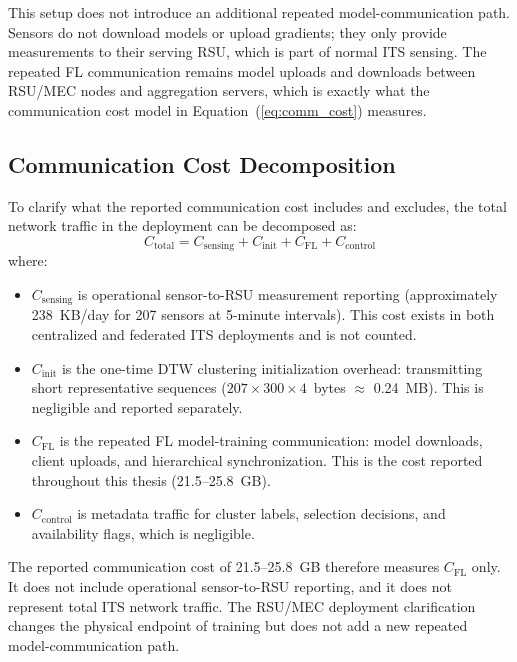 This setup does not introduce an additional repeated model-communication path. Sensors do not download models or upload gradients; they only provide measurements to their serving RSU, which is part of normal ITS sensing. The repeated FL communication remains model uploads and downloads between RSU/MEC nodes and aggregation servers, which is exactly what the communication cost model in Equation~(\ref{eq:comm_cost}) measures.

\subsection{Communication Cost Decomposition}
\label{sec:comm_decomp}

To clarify what the reported communication cost includes and excludes, the total network traffic in the deployment can be decomposed as:
\begin{equation}
\label{eq:comm_decomp}
C_{\text{total}} = C_{\text{sensing}} + C_{\text{init}} + C_{\text{FL}} + C_{\text{control}}
\end{equation}
where:
\begin{itemize}
    \item $C_{\text{sensing}}$ is operational sensor-to-RSU measurement reporting (approximately 238~KB/day for 207 sensors at 5-minute intervals). This cost exists in both centralized and federated ITS deployments and is not counted.
    \item $C_{\text{init}}$ is the one-time DTW clustering initialization overhead: transmitting short representative sequences ($207 \times 300 \times 4$~bytes $\approx$ 0.24~MB). This is negligible and reported separately.
    \item $C_{\text{FL}}$ is the repeated FL model-training communication: model downloads, client uploads, and hierarchical synchronization. This is the cost reported throughout this thesis (21.5--25.8~GB).
    \item $C_{\text{control}}$ is metadata traffic for cluster labels, selection decisions, and availability flags, which is negligible.
\end{itemize}

The reported communication cost of 21.5--25.8~GB therefore measures $C_{\text{FL}}$ only. It does not include operational sensor-to-RSU reporting, and it does not represent total ITS network traffic. The RSU/MEC deployment clarification changes the physical endpoint of training but does not add a new repeated model-communication path.

